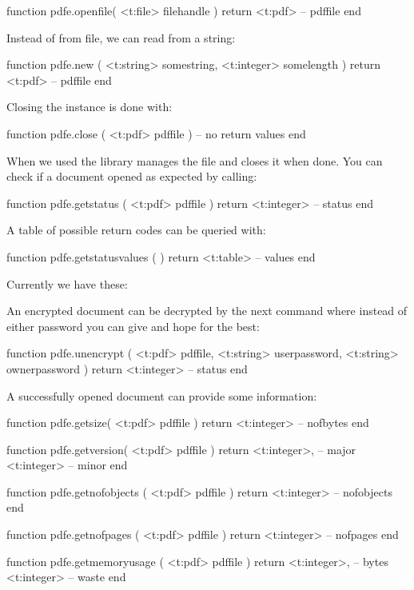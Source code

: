 function pdfe.openfile( <t:file> filehandle )
    return <t:pdf> -- pdffile
end
\stoptyping

Instead of from file, we can read from a string:

\starttyping[option=LUA]
function pdfe.new ( <t:string>  somestring, <t:integer> somelength )
    return <t:pdf> -- pdffile
end
\stoptyping

Closing the instance is done with:

\starttyping[option=LUA]
function pdfe.close ( <t:pdf> pdffile )
    -- no return values
end
\stoptyping

When we used  the library manages the file and closes it when
done. You can check if a document opened as expected by calling:

\starttyping[option=LUA]
function pdfe.getstatus ( <t:pdf> pdffile )
    return <t:integer> -- status
end
\stoptyping

A table of possible return codes can be queried with:

\starttyping[option=LUA]
function pdfe.getstatusvalues ( )
    return <t:table> -- values
end
\stoptyping

Currently we have these:


An encrypted document can be decrypted by the next command where instead of
either password you can give  and hope for the best:

\starttyping[option=LUA]
function pdfe.unencrypt (
    <t:pdf>    pdffile,
    <t:string> userpassword,
    <t:string> ownerpassword
)
    return <t:integer> -- status
end
\stoptyping

\stopsubsection

\startsubsection[title=Getting basic information]

A successfully opened document can provide some information:

\starttyping[option=LUA]
function pdfe.getsize( <t:pdf> pdffile )
    return <t:integer> -- nofbytes
end

function pdfe.getversion( <t:pdf> pdffile )
    return
        <t:integer>, -- major
        <t:integer>  -- minor
end

function pdfe.getnofobjects ( <t:pdf> pdffile )
    return <t:integer> -- nofobjects
end

function pdfe.getnofpages ( <t:pdf> pdffile )
    return <t:integer> -- nofpages
end

function pdfe.getmemoryusage ( <t:pdf> pdffile )
    return
        <t:integer>, -- bytes
        <t:integer>  -- waste
end
\stoptyping

